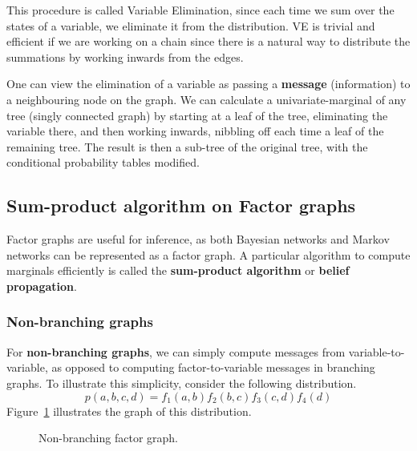 \documentclass{article}
\begin{document}
This procedure is called Variable Elimination, since each time we sum over the states of a variable, we eliminate it from the distribution. VE is trivial and efficient if we are working on a chain since there is a natural way to distribute the summations by working inwards from the edges. 

One can view the elimination of a variable as passing a \textbf{message} (information) to a neighbouring node on the graph. We can calculate a univariate-marginal of any tree (singly connected graph) by starting at a leaf of the tree, eliminating the variable there, and then working inwards, nibbling off each time a leaf of the remaining tree. The result is then a sub-tree of the original tree, with the conditional probability tables modified. 

\subsection{Sum-product algorithm on Factor graphs}

Factor graphs are useful for inference, as both Bayesian networks and Markov networks can be represented as a factor graph. A particular algorithm to compute marginals efficiently is called the \textbf{sum-product algorithm} or \textbf{belief propagation}. 

\subsubsection{Non-branching graphs}

For \textbf{non-branching graphs}, we can simply compute messages from variable-to-variable, as opposed to computing factor-to-variable messages in branching graphs. To illustrate this simplicity, consider the following distribution.
$$
    p(a, b, c, d) = f_1(a, b)f_2(b, c)f_3(c, d)f_4(d)
$$
\noindent Figure~\ref{fig:fg_simple} illustrates the graph of this distribution. 

\begin{figure}[t]
    \centering
    
    \caption{Non-branching factor graph.}
    \label{fig:fg_simple}
\end{figure}
\end{document}

